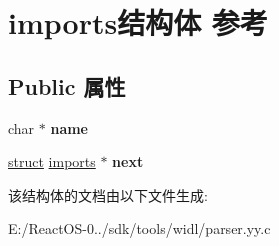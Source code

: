 \hypertarget{structimports}{}\section{imports结构体 参考}
\label{structimports}
\subsection*{Public 属性}
\begin{DoxyCompactItemize}
\item 
\mbox{\label{structimports_a5617b30a061abdace96d1680cd8355a9}} 
char $\ast$ {\bfseries name}
\item 
\mbox{\label{structimports_ad52650a1324d0c7b0a805808c469184c}} 
\hyperlink{interfacestruct}{struct} \hyperlink{structimports}{imports} $\ast$ {\bfseries next}
\end{DoxyCompactItemize}


该结构体的文档由以下文件生成\+:\begin{DoxyCompactItemize}
\item 
E\+:/\+React\+O\+S-\/0../sdk/tools/widl/parser.\+yy.\+c\end{DoxyCompactItemize}
